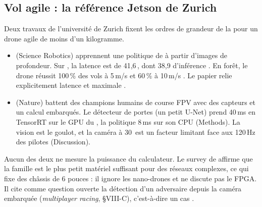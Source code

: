\subsection{Vol agile : la référence Jetson de Zurich}

Deux travaux de l'université de Zurich fixent les ordres de grandeur de la 
pour un drone agile de moins d'un kilogramme.
\begin{itemize}
  \item \citet{arxiv-2110.05113-learning-high-speed-flight-wild} (Science Robotics)
    apprennent une politique de  à partir d'images de profondeur. Sur , la latence est de 41,6\,, dont 38,9 d'inférence . En forêt, le
    drone réussit 100\,\% des vols à 5\,m/s et 60\,\% à 10\,m/s . Le papier
    relie explicitement latence et  maximale .
  \item \citet{2023-kaufmann-champion-level-drone-racing-deep} (Nature) battent des
    champions humains de course FPV avec des capteurs et un calcul embarqués. Le détecteur
    de portes (un petit U-Net) prend 40\,ms en TensorRT  sur le GPU du , la
    politique 8\,ms sur son CPU (Methods)\med. La vision est le goulot, et la caméra à
    30\, est un facteur limitant face aux 120\,Hz des pilotes (Discussion).
\end{itemize}
Aucun des deux ne mesure la puissance du calculateur. Le survey de
\citet{arxiv-2301.01755-autonomous-drone-racing-survey} affirme que la famille  est
le plus petit matériel suffisant pour des réseaux complexes, ce qui fixe des châssis de
6 pouces  : il ignore les nano-drones et ne discute pas le FPGA. Il cite comme
question ouverte la détection d'un adversaire depuis la caméra embarquée (\emph{multiplayer
racing}, §VIII-C), c'est-à-dire un cas .

